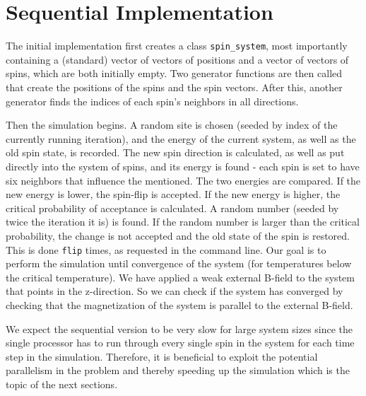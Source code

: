 \documentclass{article}
\begin{document}
\section{Sequential Implementation} \label{sec:seq_imp}
The initial implementation first creates a class \verb|spin_system|, most importantly containing a (standard) vector of vectors of positions and a vector of vectors of spins, which are both initially empty. Two generator functions are then called that create the positions of the spins and the spin vectors. After this, another generator finds the indices of each spin's neighbors in all directions.

Then the simulation begins. A random site is chosen (seeded by index of the currently running iteration), and the energy of the current system, as well as the old spin state, is recorded. The new spin direction is calculated, as well as put directly into the system of spins, and its energy is found - each spin is set to have six neighbors that influence the mentioned. The two energies are compared. If the new energy is lower, the spin-flip is accepted. If the new energy is higher, the critical probability of acceptance is calculated. A random number (seeded by twice the iteration it is) is found. If the random number is larger than the critical probability, the change is not accepted and the old state of the spin is restored. This is done \texttt{flip} times, as requested in the command line. Our goal is to perform the simulation until convergence of the system (for temperatures below the critical temperature). We have applied a weak external B-field to the system that points in the z-direction. So we can check if the system has converged by checking that the magnetization of the system is parallel to the external B-field.

We expect the sequential version to be very slow for large system sizes since the single processor has to run through every single spin in the system for each time step in the simulation. Therefore, it is beneficial to exploit the potential parallelism in the problem and thereby speeding up the simulation which is the topic of the next sections.
\end{document}
